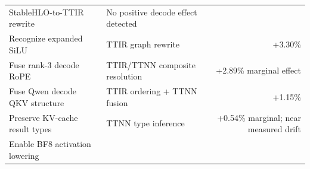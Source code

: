 \documentclass[
  10pt,
  american,
  10pt,
  letterpaper]{article}
\begin{document}
\begin{longtable}[]{@{}llr@{}}
\begin{minipage}[t]{0.30\columnwidth}
StableHLO-to-TTIR rewrite\strut
\end{minipage} & \begin{minipage}[t]{0.30\columnwidth}\raggedleft
No positive decode effect detected\strut
\end{minipage}\tabularnewline
\begin{minipage}[t]{0.30\columnwidth}\raggedright
Recognize expanded SiLU\strut
\end{minipage} & \begin{minipage}[t]{0.30\columnwidth}\raggedright
TTIR graph rewrite\strut
\end{minipage} & \begin{minipage}[t]{0.30\columnwidth}\raggedleft
+3.30\%\strut
\end{minipage}\tabularnewline
\begin{minipage}[t]{0.30\columnwidth}\raggedright
Fuse rank-3 decode RoPE\strut
\end{minipage} & \begin{minipage}[t]{0.30\columnwidth}\raggedright
TTIR/TTNN composite resolution\strut
\end{minipage} & \begin{minipage}[t]{0.30\columnwidth}\raggedleft
+2.89\% marginal effect\strut
\end{minipage}\tabularnewline
\begin{minipage}[t]{0.30\columnwidth}\raggedright
Fuse Qwen decode QKV structure\strut
\end{minipage} & \begin{minipage}[t]{0.30\columnwidth}\raggedright
TTIR ordering + TTNN fusion\strut
\end{minipage} & \begin{minipage}[t]{0.30\columnwidth}\raggedleft
+1.15\%\strut
\end{minipage}\tabularnewline
\begin{minipage}[t]{0.30\columnwidth}\raggedright
Preserve KV-cache result types\strut
\end{minipage} & \begin{minipage}[t]{0.30\columnwidth}\raggedright
TTNN type inference\strut
\end{minipage} & \begin{minipage}[t]{0.30\columnwidth}\raggedleft
+0.54\% marginal; near measured drift\strut
\end{minipage}\tabularnewline
\begin{minipage}[t]{0.30\columnwidth}\raggedright
Enable BF8 activation lowering\strut
\end{minipage} & \begin{minipage}[t]{0.30\columnwidth}\raggedright

\end{minipage}
\end{longtable}
\end{document}
